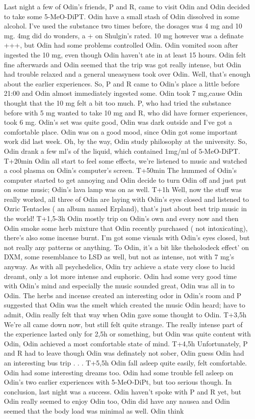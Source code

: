 \documentclass[12pt]{book}
\begin{document}
Last night a few of Odin's friends, P and R, came to visit Odin and Odin decided to take some 5-MeO-DiPT. Odin have a small stash of Odin dissolved in some alcohol. I've used the substance two times before, the dosages was 4 mg and 10 mg. 4mg did do wonders, a + on Shulgin's rated. 10 mg however was a definate +++, but Odin had some problems controlled Odin. Odin vomited soon after ingested the 10 mg, even though Odin haven't ate in at least 15 hours. Odin felt fine afterwards and Odin seemed that the trip was got really intense, but Odin had trouble relaxed and a general uneasyness took over Odin. Well, that's enough about the earlier experiences. So, P and R came to Odin's place a little before 21:00 and Odin almost immediately ingested some. Odin took 7 mg,cause Odin thought that the 10 mg felt a bit too much. P, who had tried the substance before with 5 mg wanted to take 10 mg and R, who did have former experiences, took 6 mg. Odin's set was quite good, Odin was dark outside and I've got a comfortable place. Odin was on a good mood, since Odin got some important work did last week. Oh, by the way, Odin study philosophy at the university. So, Odin drank a few ml's of the liquid, which contained 1mg/ml of 5-MeO-DiPT. T+20min Odin all start to feel some effects, we're listened to music and watched a cool plasma on Odin's computer's screen. T+50min The hummed of Odin's computer started to get annoying and Odin decide to turn Odin off and just put on some music; Odin's lava lamp was on as well. T+1h Well, now the stuff was really worked, all three of Odin are laying with Odin's eyes closed and listened to Ozric Tentacles ( an album named Erpland), that's just about best trip music in the world! T+1,5-3h Odin mostly trip on Odin's own and every now and then Odin smoke some herb mixture that Odin recently purchased ( not intoxicating), there's also some incense burnt. I'm got some visuals with Odin's eyes closed, but not really any patterns or anything. To Odin, it's a bit like theholodeck effect' on DXM, some resemblance to LSD as well, but not as intense, not with 7 mg's anyway. As with all psychedelics, Odin try achieve a state very close to lucid dreamt, only a lot more intense and euphoric. Odin had some very good time with Odin's mind and especially the music sounded great, Odin was all in to Odin. The herbs and incense created an interesting odor in Odin's room and P suggested that Odin was the smelt which created the music Odin heard; have to admit, Odin really felt that way when Odin gave some thought to Odin. T+3,5h We're all came down now, but still felt quite strange. The really intense part of the experience lasted only for 2,5h or something, but Odin was quite content with Odin, Odin achieved a most comfortable state of mind. T+4,5h Unfortunately, P and R had to leave though Odin was definately not sober, Odin guess Odin had an interesting bus trip . . .  T+5,5h Odin fall asleep quite easily, felt comfortable. Odin had some interesting dreams too. Odin had some trouble fell asleep on Odin's two earlier experiences with 5-MeO-DiPt, but too serious though. In conclusion, last night was a success. Odin haven't spoke with P and R yet, but Odin really seemed to enjoy Odin too, Odin did have any nausea and Odin seemed that the body load was minimal as well. Odin think 
\end{document}
